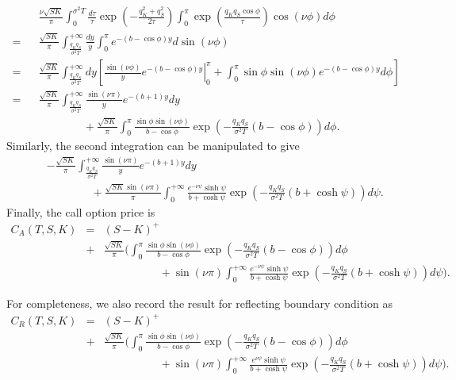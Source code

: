 \documentclass[12pt]{article}
\begin{document}
  \begin{eqnarray}
    && \frac{\nu\sqrt{SK}}{\pi}\int_0^{\sigma^2 T}\frac{d\tau}{\tau}\exp\left(-\frac{q_K^2+q_S^2}{2\tau}\right)
       \int_0^{\pi}\exp\left(\frac{q_Kq_S\cos\phi}{\tau}\right)\cos(\nu\phi)d\phi\nonumber\\
    = && \frac{\sqrt{SK}}{\pi}\int_{\frac{q_Kq_S}{\sigma^2 T}}^{+\infty}\frac{dy}{y}
       \int_0^{\pi}e^{-(b-\cos\phi)y}d\sin(\nu\phi)\nonumber\\
    = && \frac{\sqrt{SK}}{\pi}\int_{\frac{q_Kq_S}{\sigma^2 T}}^{+\infty}dy
         \left[\left.\frac{\sin(\nu\phi)}{y}e^{-(b-\cos\phi)y}\right|_0^{\pi}
              +\int_0^{\pi}\sin\phi\sin(\nu\phi)e^{-(b-\cos\phi)y}d\phi\right]\nonumber\\
    = && \frac{\sqrt{SK}}{\pi}\int_{\frac{q_Kq_S}{\sigma^2 T}}^{+\infty}\frac{\sin(\nu\pi)}{y}e^{-(b+1)y}dy\nonumber\\
      && \quad\quad\quad\quad+ \frac{\sqrt{SK}}{\pi}\int_0^{\pi}\frac{\sin\phi\sin(\nu\phi)}{b-\cos\phi}
       \exp\left(-\frac{q_Kq_S}{\sigma^2T}\left(b-\cos\phi\right)\right)d\phi.
  \end{eqnarray}
  Similarly, the second integration can be manipulated to give
  \begin{eqnarray}
    && -\frac{\sqrt{SK}}{\pi}\int_{\frac{q_Kq_S}{\sigma^2 T}}^{+\infty}\frac{\sin(\nu\pi)}{y}e^{-(b+1)y}dy\nonumber\\
      && \quad\quad\quad\quad+ \frac{\sqrt{SK}\sin(\nu\pi)}{\pi}\int_0^{+\infty}\frac{e^{-\nu \psi}\sinh \psi}{b+\cosh \psi}
       \exp\left(-\frac{q_Kq_S}{\sigma^2T}\left(b+\cosh \psi\right)\right)d\psi.
  \end{eqnarray}
  Finally, the call option price is
  \begin{eqnarray}
    C_A(T,S,K) &=& (S-K)^+ \nonumber\\
             &+&\frac{\sqrt{SK}}{\pi}\Bigg(\int_0^{\pi}\frac{\sin\phi\sin(\nu\phi)}{b-\cos\phi}
                        \exp\left(-\frac{q_Kq_S}{\sigma^2T}\left(b-\cos\phi\right)\right)d\phi\nonumber\\
             &&\quad\quad\quad\quad\quad + \sin(\nu\pi)\int_0^{+\infty}\frac{e^{-\nu \psi}\sinh \psi}{b+\cosh \psi}
       \exp\left(-\frac{q_Kq_S}{\sigma^2T}\left(b+\cosh \psi\right)\right)d\psi\Bigg).
    \label{CEVAbsorbingCall}
  \end{eqnarray}

  For completeness, we also record the result for reflecting boundary condition as
  \begin{eqnarray}
    C_R(T,S,K) &=& (S-K)^+ \nonumber\\
             &+&\frac{\sqrt{SK}}{\pi}\Bigg(\int_0^{\pi}\frac{\sin\phi\sin(\nu\phi)}{b-\cos\phi}
                        \exp\left(-\frac{q_Kq_S}{\sigma^2T}\left(b-\cos\phi\right)\right)d\phi\nonumber\\
             &&\quad\quad\quad\quad\quad + \sin(\nu\pi)\int_0^{+\infty}\frac{e^{\nu \psi}\sinh \psi}{b+\cosh \psi}
       \exp\left(-\frac{q_Kq_S}{\sigma^2T}\left(b+\cosh \psi\right)\right)d\psi\Bigg).
  \end{eqnarray}
\end{document}
